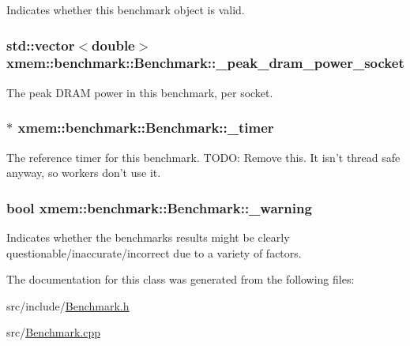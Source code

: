 Indicates whether this benchmark object is valid. \hypertarget{classxmem_1_1benchmark_1_1_benchmark_a4da600693ba1df4fb69c1304b23b2cde}{
\subsubsection[{\-\_\-peak\-\_\-dram\-\_\-power\-\_\-socket}]{\setlength{\rightskip}{0pt plus 5cm}std\-::vector$<$double$>$ xmem\-::benchmark\-::\-Benchmark\-::\-\_\-peak\-\_\-dram\-\_\-power\-\_\-socket\hspace{0.3cm}{\ttfamily [protected]}}}\label{classxmem_1_1benchmark_1_1_benchmark_a4da600693ba1df4fb69c1304b23b2cde}
The peak D\-R\-A\-M power in this benchmark, per socket. \hypertarget{classxmem_1_1benchmark_1_1_benchmark_a673c700cb58ec0bc922f36d95dab12c9}{
\subsubsection[{\-\_\-timer}]{$\ast$ xmem\-::benchmark\-::\-Benchmark\-::\-\_\-timer\hspace{0.3cm}{\ttfamily [protected]}}}\label{classxmem_1_1benchmark_1_1_benchmark_a673c700cb58ec0bc922f36d95dab12c9}
The reference timer for this benchmark. T\-O\-D\-O\-: Remove this. It isn't thread safe anyway, so workers don't use it. \hypertarget{classxmem_1_1benchmark_1_1_benchmark_af1a72e70f81c91f7c004ae01b2353288}{
\subsubsection[{\-\_\-warning}]{\setlength{\rightskip}{0pt plus 5cm}bool xmem\-::benchmark\-::\-Benchmark\-::\-\_\-warning\hspace{0.3cm}{\ttfamily [protected]}}}\label{classxmem_1_1benchmark_1_1_benchmark_af1a72e70f81c91f7c004ae01b2353288}
Indicates whether the benchmarks results might be clearly questionable/inaccurate/incorrect due to a variety of factors. 

The documentation for this class was generated from the following files\-:\begin{DoxyCompactItemize}
\item 
src/include/\hyperlink{_benchmark_8h}{Benchmark.\-h}\item 
src/\hyperlink{_benchmark_8cpp}{Benchmark.\-cpp}\end{DoxyCompactItemize}
